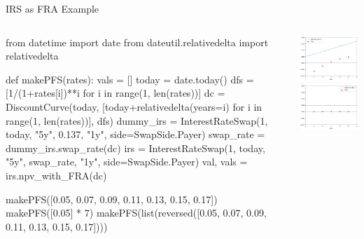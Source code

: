\documentclass{beamer}
\begin{document}
\begin{frame}[fragile]{IRS as FRA Example}
\begin{columns}
\begin{ipython}
from datetime import date
from dateutil.relativedelta import relativedelta

def makePFS(rates):
  vals = []
  today = date.today()
  dfs = [1/(1+rates[i])**i for i in range(1, len(rates))]
  dc = DiscountCurve(today,
                     [today+relativedelta(years=i) for i in range(1, len(rates))],
                     dfs)
  dummy_irs = InterestRateSwap(1, today, "5y", 0.137, "1y", side=SwapSide.Payer)
  swap_rate = dummy_irs.swap_rate(dc)
  irs = InterestRateSwap(1, today, "5y", swap_rate, "1y", side=SwapSide.Payer)
  val, vals = irs.npv_with_FRA(dc)

makePFS([0.05, 0.07, 0.09, 0.11, 0.13, 0.15, 0.17])
makePFS([0.05] * 7)
makePFS(list(reversed([0.05, 0.07, 0.09, 0.11, 0.13, 0.15, 0.17])))
\end{ipython}
        \includegraphics[width=0.62\linewidth]{images/swap_fra_up.png}\\
        \includegraphics[width=0.62\linewidth]{images/swap_fra_flat.png}\\

\end{columns}
\end{frame}
\end{document}
